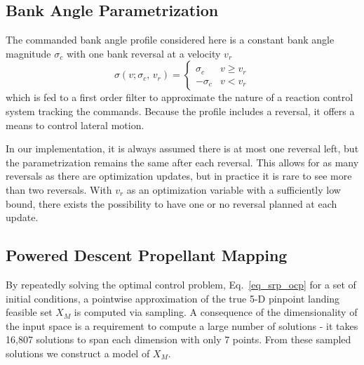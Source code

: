 \documentclass[letterpaper, preprint, paper,11pt]{AAS}
\begin{document}


\subsection{Bank Angle Parametrization}

The commanded bank angle profile considered here is a constant bank angle magnitude $\sigma_c$ with one bank reversal at a velocity $v_r$
\begin{equation}
\sigma(v; \sigma_c, \,v_r) = \left\{
\begin{array}{ll}
\sigma_c & v\geq v_r \\
-\sigma_c & v < v_r
\end{array} 
\right.
\end{equation}
which is fed to a first order filter to approximate the nature of a reaction control system tracking the commands. Because the profile includes a reversal, it offers a means to control lateral motion. 

In our implementation, it is always assumed there is at most one reversal left, but the parametrization remains the same after each reversal. This allows for as many reversals as there are optimization updates, but in practice it is rare to see more than two reversals. With $v_r$ as an optimization variable with a sufficiently low bound, there exists the possibility to have one or no reversal planned at each update.  

\subsection{Powered Descent Propellant Mapping}
By repeatedly solving the optimal control problem, Eq.~\ref{eq_srp_ocp} for a set of initial conditions, a pointwise approximation of the true 5-D pinpoint landing feasible set $X_M$ is computed via sampling. A consequence of the dimensionality of the input space is a requirement to compute a large number of solutions - it takes 16,807 solutions to span each dimension with only 7 points. From these sampled solutions we construct a model of $X_M$. 
\end{document}
